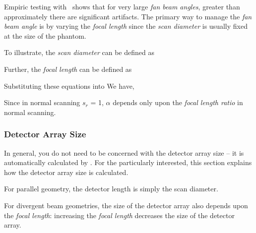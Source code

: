 Empiric testing with \ctsim\ shows that for very large \emph{fan beam angles},
greater than approximately
there are significant artifacts. The primary way to manage the
\emph{fan beam angle} is by varying the \emph{focal length} since the
\emph{scan diameter} is usually fixed at the size of the phantom.

To illustrate, the \emph{scan diameter} can be defined as

Further, the \emph{focal length} can be defined as

Substituting these equations into  We have,
 

Since in normal scanning $s_r$ = 1, $\alpha$ depends only upon the
\emph{focal length ratio} in normal scanning.

\subsubsection{Detector Array Size}
In general, you do not need to be concerned with the detector
array size -- it is automatically calculated by \ctsim. For the
particularly interested, this section explains how the detector
array size is calculated.

For parallel geometry, the detector length is simply the scan
diameter.

For divergent beam geometries, the size of the detector array also
depends upon the \emph{focal length}: increasing the \emph{focal
length} decreases the size of the detector array.

